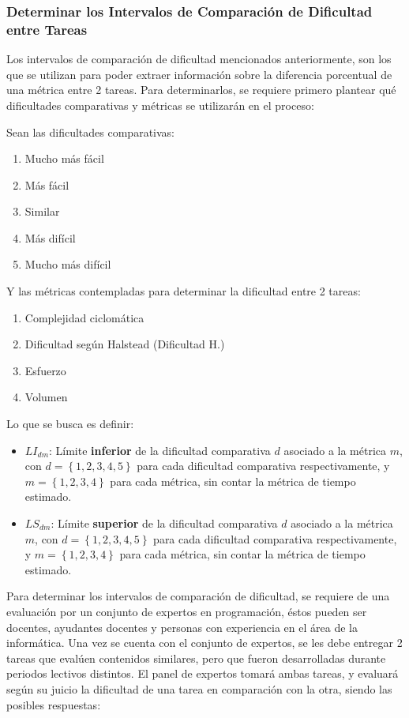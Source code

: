 \documentclass[letterpaper,12pt]{article}
\begin{document}
\subsubsection{Determinar los Intervalos de Comparación de Dificultad entre Tareas}

Los intervalos de comparación de dificultad mencionados anteriormente, son los que se utilizan para poder extraer información sobre la diferencia porcentual de una métrica entre 2 tareas. Para determinarlos, se requiere primero plantear qué dificultades comparativas y métricas se utilizarán en el proceso:

Sean las dificultades comparativas:

\begin{enumerate}
  \item Mucho más fácil
  \item Más fácil
  \item Similar
  \item Más difícil
  \item Mucho más difícil
\end{enumerate}


Y las métricas contempladas para determinar la dificultad entre 2 tareas:

\begin{enumerate}
  \item Complejidad ciclomática
  \item Dificultad según Halstead (Dificultad H.)
  \item Esfuerzo
  \item Volumen
\end{enumerate}

Lo que se busca es definir:

\begin{itemize}
  \item $LI_{dm}$: Límite \textbf{inferior} de la dificultad comparativa $d$ asociado a la métrica $m$, con $d = \left\{1, 2, 3, 4, 5\right\}$ para cada dificultad comparativa respectivamente, y $m = \left\{1, 2, 3, 4\right\}$ para cada métrica, sin contar la métrica de tiempo estimado.
  \item $LS_{dm}$: Límite \textbf{superior} de la dificultad comparativa $d$ asociado a la métrica $m$, con $d = \left\{1, 2, 3, 4, 5\right\}$ para cada dificultad comparativa respectivamente, y $m = \left\{1, 2, 3, 4\right\}$ para cada métrica, sin contar la métrica de tiempo estimado.
\end{itemize}

Para determinar los intervalos de comparación de dificultad, se requiere de una evaluación por un conjunto de expertos en programación, éstos pueden ser docentes, ayudantes docentes y personas con experiencia en el área de la informática. Una vez se cuenta con el conjunto de expertos, se les debe entregar 2 tareas que evalúen contenidos similares, pero que fueron desarrolladas durante periodos lectivos distintos. El panel de expertos tomará ambas tareas, y evaluará según su juicio la dificultad de una tarea en comparación con la otra, siendo las posibles respuestas:
\end{document}
